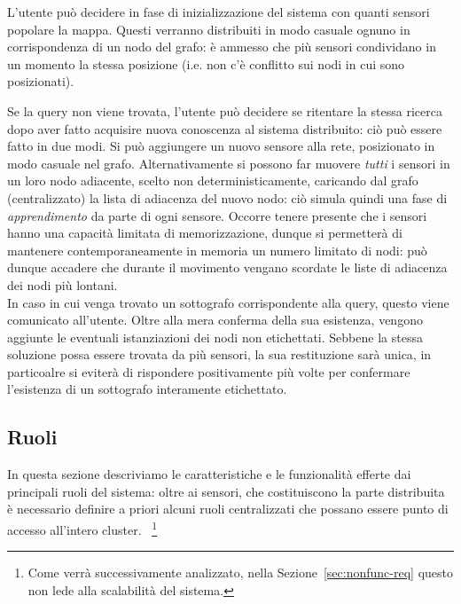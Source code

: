 \documentclass{llncs}
\begin{document}
L'utente può decidere in fase di inizializzazione del sistema con quanti
sensori popolare la mappa. Questi verranno distribuiti in modo casuale
ognuno in corrispondenza di un nodo del grafo: è ammesso che più
sensori condividano in un momento la stessa posizione
(i.e. non c'è conflitto sui nodi in cui sono posizionati).


Se la query non viene trovata, l'utente può decidere se ritentare
la stessa ricerca dopo aver fatto acquisire nuova conoscenza al sistema
distribuito: ciò può essere fatto in due modi.
Si può aggiungere un nuovo sensore alla rete, posizionato in modo
casuale nel grafo. Alternativamente
si possono far muovere \emph{tutti} i sensori in un loro nodo adiacente,
scelto non deterministicamente, caricando dal grafo (centralizzato)
la lista di adiacenza del nuovo nodo: ciò simula quindi una fase di
\emph{apprendimento} da parte di ogni sensore. Occorre tenere presente
che i sensori hanno una capacità limitata di memorizzazione,
dunque si permetterà di mantenere contemporaneamente in memoria un
numero limitato di nodi: può dunque accadere che durante il movimento
vengano scordate le liste di adiacenza dei nodi più lontani.
\\

In caso in cui venga trovato un sottografo corrispondente alla query,
questo viene comunicato all'utente.
Oltre alla mera conferma della sua esistenza, vengono aggiunte
le eventuali istanziazioni dei nodi non etichettati.
Sebbene la stessa soluzione possa essere trovata da più sensori,
la sua restituzione sarà unica, in particoalre si eviterà di rispondere
positivamente più volte per confermare l'esistenza di un sottografo
interamente etichettato.\\


\subsection{Ruoli}
In questa sezione descriviamo le caratteristiche e le funzionalità
efferte dai principali ruoli del sistema:
oltre ai sensori, che costituiscono la parte distribuita
è necessario definire a priori alcuni ruoli centralizzati
che possano essere punto di accesso all'intero cluster.%
~\footnote{Come verrà successivamente analizzato,
  nella Sezione~\ref{sec:nonfunc-req} questo non lede alla
  scalabilità del sistema.}
\end{document}
